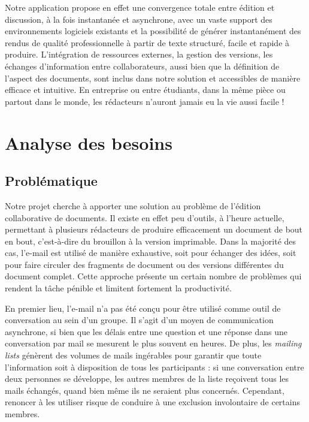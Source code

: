 \documentclass[10pt,twocolumn,a4paper,utf8x]{article}
\begin{document}
Notre application propose en effet une convergence totale entre édition
et discussion, à la fois instantanée et asynchrone, avec un vaste
support des environnements logiciels existants et la possibilité de
générer instantanément des rendus de qualité professionnelle à partir de
texte structuré, facile et rapide à produire. L'intégration de
ressources externes, la gestion des versions, les échanges d'information
entre collaborateurs, aussi bien que la définition de l'aspect des
documents, sont inclus dans notre solution et accessibles de manière
efficace et intuitive. En entreprise ou entre étudiants, dans la même
pièce ou partout dans le monde, les rédacteurs n'auront jamais eu la vie
aussi facile !

\section{Analyse des besoins}

\subsection{Problématique}

Notre projet cherche à apporter une solution au problème de l'édition
collaborative de documents. Il existe en effet peu d'outils, à l'heure
actuelle, permettant à plusieurs rédacteurs de produire efficacement un
document de bout en bout, c'est-à-dire du brouillon à la version
imprimable. Dans la majorité des cas, l'e-mail est utilisé de manière
exhaustive, soit pour échanger des idées, soit pour faire circuler des
fragments de document ou des versions différentes du document complet.
Cette approche présente un certain nombre de problèmes qui rendent la
tâche pénible et limitent fortement la productivité.

En premier lieu, l'e-mail n'a pas été conçu pour être utilisé comme
outil de conversation au sein d'un groupe. Il s'agit d'un moyen de
communication asynchrone, si bien que les délais entre une question et
une réponse dans une conversation par mail se mesurent le plus souvent
en heures. De plus, les \emph{mailing lists} génèrent des volumes de
mails ingérables pour garantir que toute l'information soit à
disposition de tous les participants : si une conversation entre deux
personnes se développe, les autres membres de la liste reçoivent tous
les mails échangés, quand bien même ils ne seraient plus concernés.
Cependant, renoncer à les utiliser risque de conduire à une exclusion
involontaire de certains membres.
\end{document}
